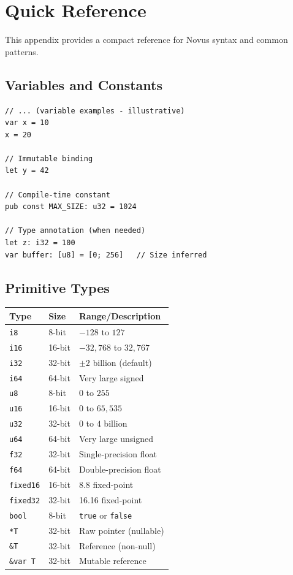 \chapter{Quick Reference}
\label{ch:cheatsheet}

This appendix provides a compact reference for Novus syntax and common patterns.

\section{Variables and Constants}

\begin{lstlisting}
// ... (variable examples - illustrative)
var x = 10
x = 20

// Immutable binding
let y = 42

// Compile-time constant
pub const MAX_SIZE: u32 = 1024

// Type annotation (when needed)
let z: i32 = 100
var buffer: [u8] = [0; 256]   // Size inferred
\end{lstlisting}

\section{Primitive Types}

\begin{center}
\begin{tabular}{lll}
\textbf{Type} & \textbf{Size} & \textbf{Range/Description} \\
\hline
\texttt{i8} & 8-bit & $-128$ to $127$ \\
\texttt{i16} & 16-bit & $-32{,}768$ to $32{,}767$ \\
\texttt{i32} & 32-bit & $\pm 2$ billion (default) \\
\texttt{i64} & 64-bit & Very large signed \\
\texttt{u8} & 8-bit & $0$ to $255$ \\
\texttt{u16} & 16-bit & $0$ to $65{,}535$ \\
\texttt{u32} & 32-bit & $0$ to $4$ billion \\
\texttt{u64} & 64-bit & Very large unsigned \\
\texttt{f32} & 32-bit & Single-precision float \\
\texttt{f64} & 64-bit & Double-precision float \\
\texttt{fixed16} & 16-bit & 8.8 fixed-point \\
\texttt{fixed32} & 32-bit & 16.16 fixed-point \\
\texttt{bool} & 8-bit & \texttt{true} or \texttt{false} \\
\texttt{*T} & 32-bit & Raw pointer (nullable) \\
\texttt{\&T} & 32-bit & Reference (non-null) \\
\texttt{\&var T} & 32-bit & Mutable reference \\
\end{tabular}
\end{center}

